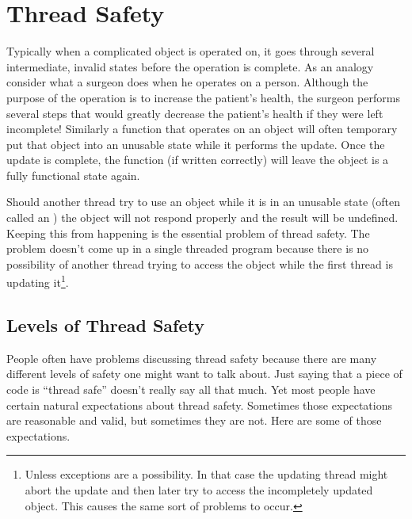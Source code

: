 
\section{Thread Safety}
\label{sec:thread-safety}

Typically when a complicated object is operated on, it goes through several intermediate,
invalid states before the operation is complete. As an analogy consider what a surgeon does when
he operates on a person. Although the purpose of the operation is to increase the patient's
health, the surgeon performs several steps that would greatly decrease the patient's health if
they were left incomplete! Similarly a function that operates on an object will often temporary
put that object into an unusable state while it performs the update. Once the update is
complete, the function (if written correctly) will leave the object is a fully functional state
again.

Should another thread try to use an object while it is in an unusable state (often called an
) the object will not respond properly and the result will be
undefined. Keeping this from happening is the essential problem of thread safety. The problem
doesn't come up in a single threaded program because there is no possibility of another thread
trying to access the object while the first thread is updating it\footnote{Unless exceptions are
  a possibility. In that case the updating thread might abort the update and then later try to
  access the incompletely updated object. This causes the same sort of problems to occur.}.

\subsection{Levels of Thread Safety}
\label{subsec:levels-safety}

People often have problems discussing thread safety because there are many different levels of
safety one might want to talk about. Just saying that a piece of code is ``thread safe'' doesn't
really say all that much. Yet most people have certain natural expectations about thread safety.
Sometimes those expectations are reasonable and valid, but sometimes they are not. Here are some
of those expectations.

